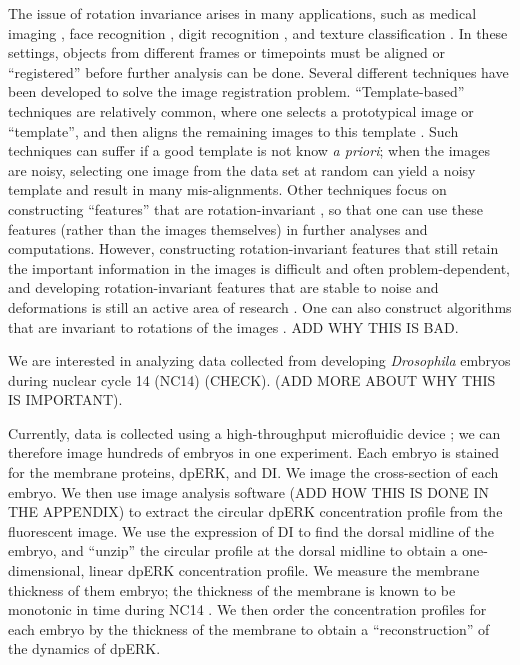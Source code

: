 \documentclass[10pt]{article}
\begin{document}
The issue of rotation invariance arises in many applications, such as medical imaging \cite{hajnal2010medical}, face recognition \cite{rowley1998rotation}, digit recognition \cite{simard1992efficient}, and texture classification \cite{greenspan1994rotation}.
%
In these settings, objects from different frames or timepoints must be aligned or ``registered'' before further analysis can be done.
%
%
%
Several different techniques have been developed to solve the image registration problem. 
%
``Template-based'' techniques are relatively common, where one selects a prototypical image or ``template'', and then aligns the remaining images to this template \cite{ahuja2007template}.
%
Such techniques can suffer if a good template is not know {\em a priori}; when the images are noisy, selecting one image from the data set at random can yield a noisy template and result in many mis-alignments. 
%
Other techniques focus on constructing ``features'' that are rotation-invariant \cite{flusser2000independence, lowe1999object, sadler1992shift, ojala2002multiresolution}, so that one can use these features (rather than the images themselves) in further analyses and computations.
%
However, constructing rotation-invariant features that still retain the important information in the images is difficult and often problem-dependent, and developing rotation-invariant features that are stable to noise and deformations is still an active area of research \cite{mallat2012group, sifre2013rotation}.
%
One can also construct algorithms that are invariant to rotations of the images \cite{hilai1994recognition, zhao2013fourier}.
%
ADD WHY THIS IS BAD.

We are interested in analyzing data collected from developing {\em Drosophila} embryos during nuclear cycle 14 (NC14) (CHECK).
%
(ADD MORE ABOUT WHY THIS IS IMPORTANT).

Currently, data is collected using a high-throughput microfluidic device \cite{chung2010microfluidic}; we can therefore image hundreds of embryos in one experiment.
%
Each embryo is stained for the membrane proteins, dpERK, and DI. 
%
We image the cross-section of each embryo.
%
We then use image analysis software (ADD HOW THIS IS DONE IN THE APPENDIX) to extract the circular dpERK concentration profile from the fluorescent image.
%
We use the expression of DI to find the dorsal midline of the embryo, and ``unzip'' the circular profile at the dorsal midline to obtain a one-dimensional, linear dpERK concentration profile.
%
We measure the membrane thickness of them embryo; the thickness of the membrane is known to be monotonic in time during NC14 \cite{...}. 
%
We then order the concentration profiles for each embryo by the thickness of the membrane to obtain a ``reconstruction'' of the dynamics of dpERK.
\end{document}
